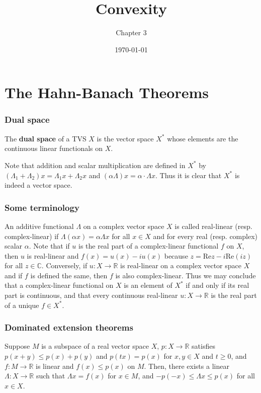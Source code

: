 \documentclass{beamer}
\title{Convexity}
\author{Chapter 3}
\institute{Functional Analysis}
\date{\today}
\begin{document}
\begin{frame}
\titlepage
\end{frame}
\section{The Hahn-Banach Theorems}
\begin{frame}
\frametitle{Dual space}
\begin{definition}
    The \textbf{dual space} of a TVS $X$ is the vector space $X^*$ whose elements are the continuous linear functionals on $X$.
\end{definition}
Note that addition and scalar multiplication are defined in $X^*$ by $(\Lambda_1 + \Lambda_2)x = \Lambda_1 x + \Lambda_2 x$ and $(\alpha\Lambda)x = \alpha \cdot \Lambda x$. Thus it is clear that $X^*$ is indeed a vector space.
\end{frame}
\begin{frame}
\frametitle{Some terminology}
An additive functional $\Lambda$ on a complex vector space $X$ is called real-linear (resp. complex-linear) if $\Lambda(\alpha x) = \alpha \Lambda x$ for all $x \in X$ and for every real (resp. complex) scalar $\alpha$. \newline\newline Note that if $u$ is the real part of a complex-linear functional $f$ on $X$, then $u$ is real-linear and $f(x) = u(x) - iu(x)$ because $z = \text{Re}z - i\text{Re}(iz)$ for all $z\in \mathbb{C}$. Conversely, if $u:X \to \mathbb{R}$ is real-linear on a complex vector space $X$ and if $f$ is defined the same, then $f$ is also complex-linear. \newline\newline Thus we may conclude that a complex-linear functional on $X$ is an element of $X^*$ if and only if its real part is continuous, and that every continuous real-linear $u:X \to \mathbb{R}$ is the real part of a unique $f\in X^*$.
\end{frame}
\begin{frame}
\frametitle{Dominated extension theorems}
\begin{theorem}
    Suppose $M$ is a subspace of a real vector space $X$, $p:X\to \mathbb{R}$ satisfies $p(x+y)\leq p(x) + p(y)$ and $p(tx) = p(x)$ for $x,y\in X$ and $t\geq 0$, and $f:M\to \mathbb{R}$ is linear and $f(x) \leq p(x)$ on $M$. Then, there exists a linear $\Lambda : X \to \mathbb{R}$ such that $\Lambda x = f(x)$ for $x\in M$, and $-p(-x) \leq \Lambda x \leq p(x)$ for all $x \in X$.
\end{theorem}
\end{frame}
\end{document}
